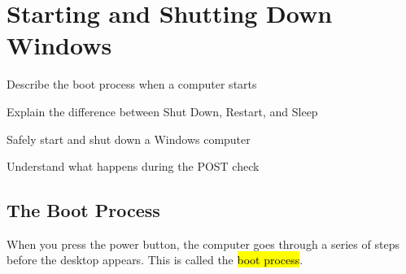 
\chapter{Starting and Shutting Down Windows}
\label{ch:startup}

\begin{objectives}
  \item Describe the boot process when a computer starts
  \item Explain the difference between Shut Down, Restart, and Sleep
  \item Safely start and shut down a Windows computer
  \item Understand what happens during the POST check
\end{objectives}


\section{The Boot Process}
\label{sec:boot-process}

When you press the power button, the computer goes through a series of steps before the desktop appears. This is called the \hl{boot process}.

